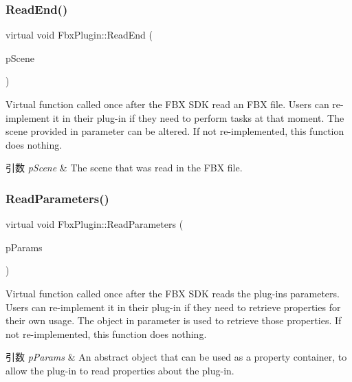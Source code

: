\subsubsection{\texorpdfstring{Read\+End()}{ReadEnd()}}
{\footnotesize\ttfamily virtual void Fbx\+Plugin\+::\+Read\+End (\begin{DoxyParamCaption}\item[{\hyperlink{class_fbx_scene}{Fbx\+Scene} \&}]{p\+Scene }\end{DoxyParamCaption})\hspace{0.3cm}{\ttfamily [virtual]}}

Virtual function called once after the F\+BX S\+DK read an F\+BX file. Users can re-\/implement it in their plug-\/in if they need to perform tasks at that moment. The scene provided in parameter can be altered. If not re-\/implemented, this function does nothing. 
\begin{DoxyParams}{引数}
{\em p\+Scene} & The scene that was read in the F\+BX file. \\
\hline
\end{DoxyParams}
\mbox{\label{class_fbx_plugin_ab64d3a67a358e3b9466bc8f6d26e3be2}} 
\subsubsection{\texorpdfstring{Read\+Parameters()}{ReadParameters()}}
{\footnotesize\ttfamily virtual void Fbx\+Plugin\+::\+Read\+Parameters (\begin{DoxyParamCaption}\item[{\hyperlink{class_fbx_object}{Fbx\+Object} \&}]{p\+Params }\end{DoxyParamCaption})\hspace{0.3cm}{\ttfamily [virtual]}}

Virtual function called once after the F\+BX S\+DK reads the plug-\/in\textquotesingle{}s parameters. Users can re-\/implement it in their plug-\/in if they need to retrieve properties for their own usage. The object in parameter is used to retrieve those properties. If not re-\/implemented, this function does nothing. 
\begin{DoxyParams}{引数}
{\em p\+Params} & An abstract object that can be used as a property container, to allow the plug-\/in to read properties about the plug-\/in. \\
\hline
\end{DoxyParams}
\mbox{\label{class_fbx_plugin_a5b6ba0af2c0cf8a7d5cb1680407d9e7e}} 
